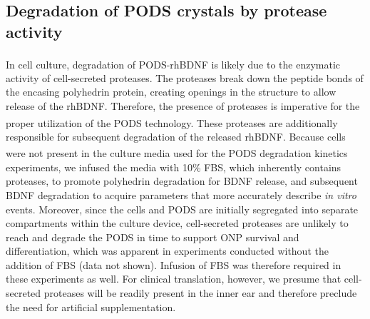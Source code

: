 \documentclass[review]{elsarticle}
\begin{document}
\subsection{Degradation of PODS\textsuperscript{\textregistered} crystals by protease activity}
In cell culture, degradation of PODS\textsuperscript{\textregistered}-rhBDNF is likely due to the enzymatic activity of cell-secreted proteases. The proteases break down the peptide bonds of the encasing polyhedrin protein, creating openings in the structure to allow release of the rhBDNF. Therefore, the presence of proteases is imperative for the proper utilization of the PODS\textsuperscript{\textregistered} technology. These proteases are additionally responsible for subsequent degradation of the released rhBDNF. Because cells were not present in the culture media used for the PODS\textsuperscript{\textregistered} degradation kinetics experiments, we infused the media with 10\% FBS, which inherently contains proteases, to promote polyhedrin degradation for BDNF release, and subsequent BDNF degradation to acquire parameters that more accurately describe \textit{in vitro} events. Moreover, since the cells and PODS are initially segregated into separate compartments within the culture device, cell-secreted proteases are unlikely to reach and degrade the PODS in time to support ONP survival and differentiation, which was apparent in experiments conducted without the addition of FBS (data not shown). Infusion of FBS was therefore required in these experiments as well. For clinical translation, however, we presume that cell-secreted proteases will be readily present in the inner ear and therefore preclude the need for artificial supplementation.
\end{document}
